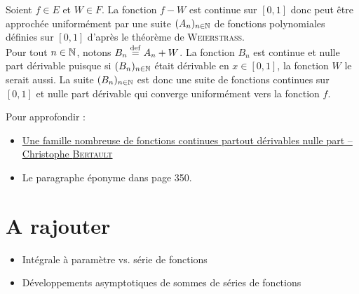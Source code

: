 \begin{preuve}
    Soient $f \in E$ et $W \in F$. La fonction $f - W$ est continue sur $[0, 1]$ donc peut être approchée uniformément par une suite $(A_n)_{n \in \mathbb{N}}$ de fonctions polynomiales définies sur $[0, 1]$ d'après le théorème de \textsc{Weierstrass}. \\
    Pour tout $n \in \mathbb{N}$, notons $B_n \overset{\mathrm{\tiny def}}{=} A_n + W$. La fonction $B_n$ est continue et nulle part dérivable puisque si $(B_n)_{n \in \mathbb{N}}$ était dérivable en $x \in [0, 1]$, la fonction $W$ le serait aussi. La suite $(B_n)_{n \in \mathbb{N}}$ est donc une suite de fonctions continues sur $[0,1]$ et nulle part dérivable qui converge uniformément vers la fonction $f$.
\end{preuve}

Pour approfondir : 
\begin{itemize}
    \item \href{http://christophebertault.fr/documents/articles/Article - Une famille nombreuse de fonctions continues partout derivables nulle part.pdf}{Une famille nombreuse de fonctions continues partout dérivables nulle part -- Christophe \textsc{Bertault}}
    \item Le paragraphe éponyme dans \cite{contre-exemples} page 350.
\end{itemize}

\section{A rajouter}

\begin{itemize}
    \item Intégrale à paramètre vs. série de fonctions
    \item Développements asymptotiques de sommes de séries de fonctions
\end{itemize}